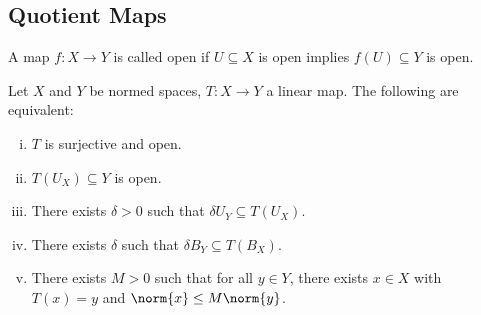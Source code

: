 \documentclass[10pt]{mypackage}
\begin{document}
\subsection{Quotient Maps}%
\begin{definition}
  A map $f: X\rightarrow Y$ is called open if $U\subseteq X$ is open implies $f(U)\subseteq Y$ is open.
\end{definition}
\begin{proposition}
  Let $X$ and $Y$ be normed spaces, $T: X\rightarrow Y$ a linear map. The following are equivalent:
  \begin{enumerate}[(i)]
    \item $T$ is surjective and open.
    \item $T\left(U_X\right)\subseteq Y$ is open.
    \item There exists $\delta > 0$ such that $\delta U_Y \subseteq T\left(U_X\right)$.
    \item There exists $\delta$ such that $\delta B_Y \subseteq T\left(B_X\right)$.
    \item There exists $M > 0$ such that for all $y\in Y$, there exists $x\in X$ with $T(x) = y$ and $\norm{x} \leq M\norm{y}$.
  \end{enumerate}
\end{proposition}
\end{document}
